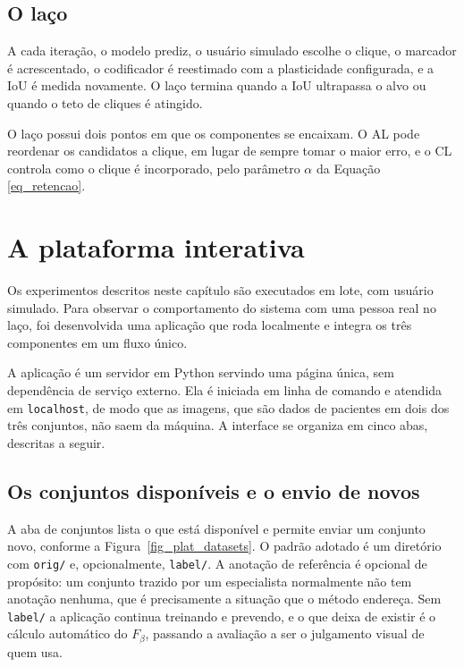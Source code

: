 \subsection{O laço}

A cada iteração, o modelo prediz, o usuário simulado escolhe o clique, o marcador é acrescentado, o codificador é reestimado com a plasticidade configurada, e a \ac{IoU} é medida novamente. O laço termina quando a \ac{IoU} ultrapassa o alvo ou quando o teto de cliques é atingido.

O laço possui dois pontos em que os componentes se encaixam. O \ac{AL} pode reordenar os candidatos a clique, em lugar de sempre tomar o maior erro, e o \ac{CL} controla como o clique é incorporado, pelo parâmetro $\alpha$ da Equação \ref{eq_retencao}.

\section{A plataforma interativa}

Os experimentos descritos neste capítulo são executados em lote, com usuário simulado. Para observar o comportamento do sistema com uma pessoa real no laço, foi desenvolvida uma aplicação que roda localmente e integra os três componentes em um fluxo único.

A aplicação é um servidor em Python servindo uma página única, sem dependência de serviço externo. Ela é iniciada em linha de comando e atendida em \texttt{localhost}, de modo que as imagens, que são dados de pacientes em dois dos três conjuntos, não saem da máquina. A interface se organiza em cinco abas, descritas a seguir.

\subsection{Os conjuntos disponíveis e o envio de novos}

A aba de conjuntos lista o que está disponível e permite enviar um conjunto novo, conforme a Figura~\ref{fig_plat_datasets}. O padrão adotado é um diretório com \texttt{orig/} e, opcionalmente, \texttt{label/}. A anotação de referência é opcional de propósito: um conjunto trazido por um especialista normalmente não tem anotação nenhuma, que é precisamente a situação que o método endereça. Sem \texttt{label/} a aplicação continua treinando e prevendo, e o que deixa de existir é o cálculo automático do $F_\beta$, passando a avaliação a ser o julgamento visual de quem usa.

